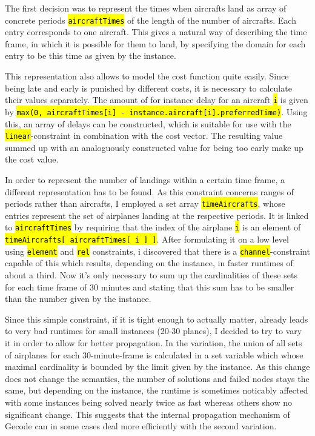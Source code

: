 \documentclass[,%
			paper=a4,%
			DIV12,
			liststotoc,
			bibtotoc,
			draft=false,%
			numbers=noendperiod
			]{scrartcl}
\newcommand{\ilc}[1]{\hl{\texttt{#1}}}
\newcommand{\mymarginnote}[1]{\marginnote{\footnotesize{#1}}}
\begin{document}
\mymarginnote{\Ctime}
The first decision was to represent the times when aircrafts land as array of concrete periods \ilc{aircraftTimes} of the length of the number of aircrafts. Each entry corresponds to one aircraft.
This gives a natural way of describing the time frame, in which it is possible for them to land, by specifying the domain for each entry to be this time as given by the instance.

\mymarginnote{\Ccost}
This representation also allows to model the cost function quite easily.
Since being late and early is punished by different costs, it is necessary to calculate their values separately.
The amount of for instance delay for an aircraft \ilc{i} is given by \ilc{max(0, aircraftTimes[i] - instance.aircraft[i].preferredTime)}.
Using this, an array of delays can be constructed, which is suitable for use with the \ilc{linear}-constraint in combination with the cost vector.
The resulting value summed up with an analoguously constructed value for being too early make up the cost value.

\mymarginnote{\Clandings}
In order to represent the number of landings within a certain time frame, a different representation has to be found.
As this constraint concerns ranges of periods rather than aircrafts, I employed a set array \ilc{timeAircrafts}, whose entries represent the set of airplanes landing at the respective periods.
It is linked to \ilc{aircraftTimes} by requiring that the index of the airplane \ilc{i} is an element of \ilc{timeAircrafts[ aircraftTimes[ i ] ]}. After formulating it on a low level using \ilc{element} and \ilc{rel} constraints, i discovered that there is a \ilc{channel}-constraint capable of this which results, depending on the instance, in faster runtimes of about a third.
Now it's only necessary to sum up the cardinalities of these sets for each time frame of 30 minutes and stating that this sum has to be smaller than the number given by the instance.

Since this simple constraint, if it is tight enough to actually matter, already leads to very bad runtimes for small instances (20-30 planes), I decided to try to vary it in order to allow for better propagation.
In the variation, the union of all sets of airplanes for each 30-minute-frame is calculated in a set variable which whose maximal cardinality is bounded by the limit given by the instance.   
As this change does not change the semantics, the number of solutions and failed nodes stays the same, but depending on the instance, the runtime is sometimes noticably affected with some instances being solved nearly twice as fast whereas others show no significant change.
This suggests that the internal propagation mechanism of Gecode can in some cases deal more efficiently with the second variation.
\end{document}
